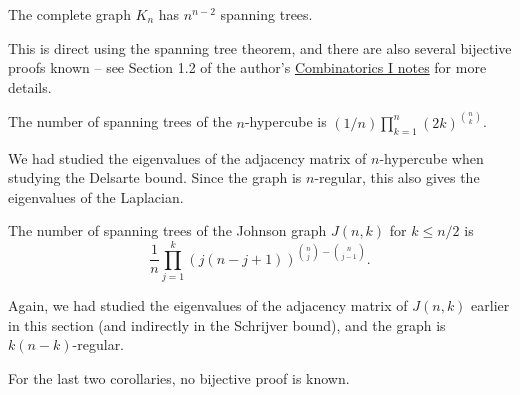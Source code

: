 	\begin{fcor}
		The complete graph $K_n$ has $n^{n-2}$ spanning trees.
	\end{fcor}
	This is direct using the spanning tree theorem, and there are also several bijective proofs known -- see Section 1.2 of the author's \href{https://amitrajaraman.github.io/notes/ma-861/}{Combinatorics I notes} for more details.

	\begin{fcor}
		The number of spanning trees of the $n$-hypercube is $(1/n) \prod_{k=1}^{n} (2k)^{\binom{n}{k}}$.
	\end{fcor}
	We had studied the eigenvalues of the adjacency matrix of $n$-hypercube when studying the Delsarte bound. Since the graph is $n$-regular, this also gives the eigenvalues of the Laplacian.

	\begin{fcor}
		The number of spanning trees of the Johnson graph $J(n,k)$ for $k \le n/2$ is
		\[ \frac{1}{n} \prod_{j=1}^{k} (j(n-j+1))^{\binom{n}{j} - \binom{n}{j-1}}. \]
	\end{fcor}
	Again, we had studied the eigenvalues of the adjacency matrix of $J(n,k)$ earlier in this section (and indirectly in the Schrijver bound), and the graph is $k(n-k)$-regular.

	For the last two corollaries, no bijective proof is known.